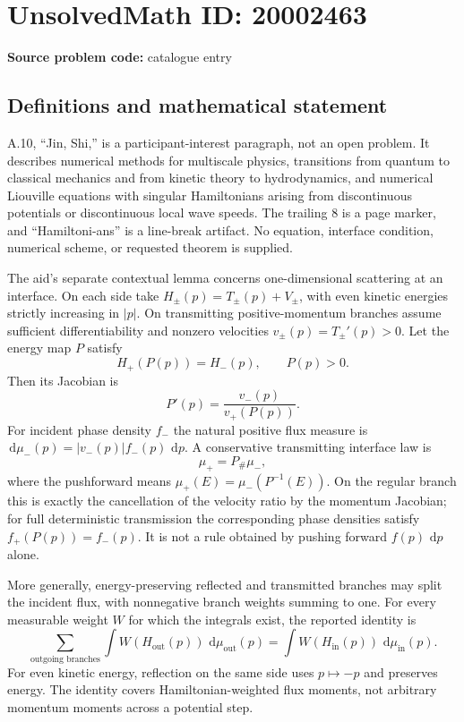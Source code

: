 \documentclass[11pt]{article}
\newcommand{\dd}{\,\mathrm{d}}
\begin{document}
\section*{UnsolvedMath ID: 20002463}
\textbf{Source problem code:} catalogue entry
\subsection{Definitions and mathematical statement}
A.10, ``Jin, Shi,'' is a participant-interest paragraph, not an open problem. It describes numerical methods for multiscale physics, transitions from quantum to classical mechanics and from kinetic theory to hydrodynamics, and numerical Liouville equations with singular Hamiltonians arising from discontinuous potentials or discontinuous local wave speeds. The trailing $8$ is a page marker, and ``Hamiltoni-ans'' is a line-break artifact. No equation, interface condition, numerical scheme, or requested theorem is supplied.

The aid's separate contextual lemma concerns one-dimensional scattering at an interface. On each side take $H_\pm(p)=T_\pm(p)+V_\pm$, with even kinetic energies strictly increasing in $|p|$. On transmitting positive-momentum branches assume sufficient differentiability and nonzero velocities $v_\pm(p)=T_\pm'(p)>0$. Let the energy map $P$ satisfy
\[
H_+(P(p))=H_-(p),\qquad P(p)>0.
\]
Then its Jacobian is
\[
P'(p)=\frac{v_-(p)}{v_+(P(p))}.
\]
For incident phase density $f_-$ the natural positive flux measure is $\dd\mu_-(p)=|v_-(p)|f_-(p)\,\dd p$. A conservative transmitting interface law is
\[
\mu_+=P_\#\mu_-,
\]
where the pushforward means $\mu_+(E)=\mu_-(P^{-1}(E))$. On the regular branch this is exactly the cancellation of the velocity ratio by the momentum Jacobian; for full deterministic transmission the corresponding phase densities satisfy $f_+(P(p))=f_-(p)$. It is not a rule obtained by pushing forward $f(p)\,\dd p$ alone.

More generally, energy-preserving reflected and transmitted branches may split the incident flux, with nonnegative branch weights summing to one. For every measurable weight $W$ for which the integrals exist, the reported identity is
\[
\sum_{\text{outgoing branches}}\int W(H_{\mathrm{out}}(p))\,\dd\mu_{\mathrm{out}}(p)
=\int W(H_{\mathrm{in}}(p))\,\dd\mu_{\mathrm{in}}(p).
\]
For even kinetic energy, reflection on the same side uses $p\mapsto-p$ and preserves energy. The identity covers Hamiltonian-weighted flux moments, not arbitrary momentum moments across a potential step.
\end{document}
